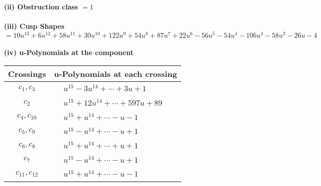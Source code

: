 \documentclass[1p]{elsarticle_modified}
\theoremstyle{definition}
\begin{document}
\flushleft \textbf{(ii) Obstruction class $= 1$}\\~\\
\flushleft \textbf{(iii) Cusp Shapes $= 10 u^{13}+6 u^{12}+58 u^{11}+30 u^{10}+122 u^9+54 u^8+87 u^7+22 u^6-56 u^5-54 u^4-106 u^3-58 u^2-26 u-4$}\\~\\
\newpage\renewcommand{\arraystretch}{1}
\flushleft \textbf{(iv) u-Polynomials at the component}\newline \\
\begin{tabular}{m{50pt}|m{274pt}}
Crossings & \hspace{64pt}u-Polynomials at each crossing \\
\hline $$\begin{aligned}c_{1},c_{3}\end{aligned}$$&$\begin{aligned}
&u^{15}-3 u^{14}+\cdots+3 u+1
\end{aligned}$\\
\hline $$\begin{aligned}c_{2}\end{aligned}$$&$\begin{aligned}
&u^{15}+12 u^{14}+\cdots+597 u+89
\end{aligned}$\\
\hline $$\begin{aligned}c_{4},c_{10}\end{aligned}$$&$\begin{aligned}
&u^{15}+u^{14}+\cdots- u-1
\end{aligned}$\\
\hline $$\begin{aligned}c_{5},c_{9}\end{aligned}$$&$\begin{aligned}
&u^{15}- u^{14}+\cdots- u+1
\end{aligned}$\\
\hline $$\begin{aligned}c_{6},c_{8}\end{aligned}$$&$\begin{aligned}
&u^{15}+u^{14}+\cdots+u+1
\end{aligned}$\\
\hline $$\begin{aligned}c_{7}\end{aligned}$$&$\begin{aligned}
&u^{15}- u^{14}+\cdots- u+1
\end{aligned}$\\
\hline $$\begin{aligned}c_{11},c_{12}\end{aligned}$$&$\begin{aligned}
&u^{15}+u^{14}+\cdots- u-1
\end{aligned}$\\
\hline
\end{tabular}\\~\\
\end{document}
